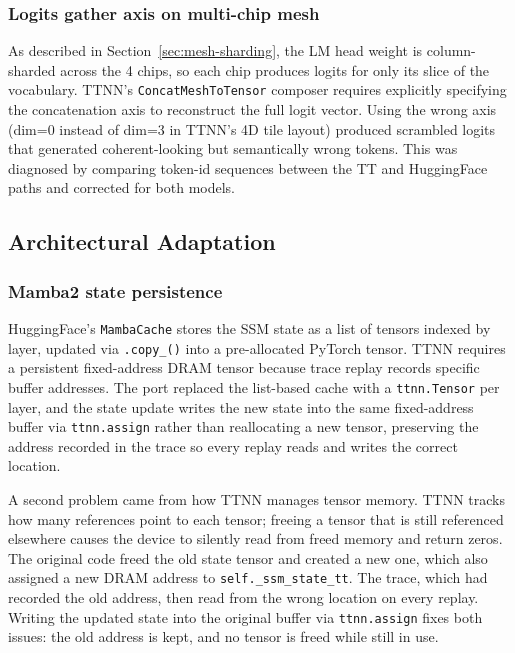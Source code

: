 \subsubsection{Logits gather axis on multi-chip mesh}

As described in Section~\ref{sec:mesh-sharding}, the LM head weight is column-sharded across the 4 chips, so each chip produces logits for only its slice of the vocabulary. TTNN's \texttt{ConcatMeshToTensor} composer requires explicitly specifying the concatenation axis to reconstruct the full logit vector. Using the wrong axis (dim=0 instead of dim=3 in TTNN's 4D tile layout) produced scrambled logits that generated coherent-looking but semantically wrong tokens. This was diagnosed by comparing token-id sequences between the TT and HuggingFace paths and corrected for both models.

\subsection{Architectural Adaptation}

\subsubsection{Mamba2 state persistence}

HuggingFace's \texttt{MambaCache} stores the SSM state as a list of tensors indexed by layer, updated via \texttt{.copy\_()} into a pre-allocated PyTorch tensor. TTNN requires a persistent fixed-address DRAM tensor because trace replay records specific buffer addresses. The port replaced the list-based cache with a \texttt{ttnn.Tensor} per layer, and the state update writes the new state into the same fixed-address buffer via \texttt{ttnn.assign} rather than reallocating a new tensor, preserving the address recorded in the trace so every replay reads and writes the correct location.

A second problem came from how TTNN manages tensor memory. TTNN tracks how many references point to each tensor; freeing a tensor that is still referenced elsewhere causes the device to silently read from freed memory and return zeros. The original code freed the old state tensor and created a new one, which also assigned a new DRAM address to \texttt{self.\_ssm\_state\_tt}. The trace, which had recorded the old address, then read from the wrong location on every replay. Writing the updated state into the original buffer via \texttt{ttnn.assign} fixes both issues: the old address is kept, and no tensor is freed while still in use.

